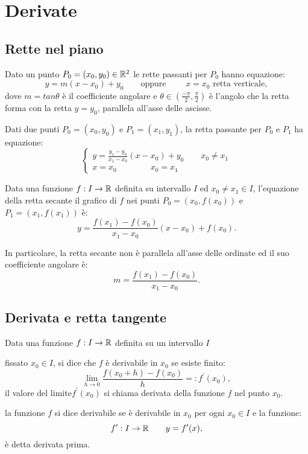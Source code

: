 
\chapter{Derivate} %

\label{ch:derivate} %


\section{Rette nel piano}
Dato un punto $P_0=(x_0,y_0)\in\mathbb{R}^2$ le rette passanti per $P_0$ hanno equazione:
\[y=m(x-x_0)+y_0 \qquad \text{oppure } \qquad x=x_0 \text{ retta verticale},\]
dove $m=tan\theta$ è il coefficiente angolare e $\theta\in(\frac{-\pi}{2},\frac{\pi}{2})$ è l'angolo che la retta forma con la retta $y=y_0$, parallela all'asse delle ascisse.

Dati due punti $P_0=(x_0,y_0)$ e $P_1=(x_1,y_1)$, la retta passante per $P_0$ e $P_1$ ha equazione:
\begin{equation*}\begin{cases}
y=\frac{y_1-y_0}{x_1-x_0}(x-x_0)+y_0 \qquad x_0\neq x_1 \\
x=x_0 \qquad \qquad x_0=x_1
\end{cases}\end{equation*}

Data una funzione $f:I\rightarrow\mathbb{R}$ definita su intervallo $I$ ed $x_0\neq x_1 \in I$, l'equazione della retta secante il grafico di $f$ nei punti $P_0=(x_0,f(x_0))$ e $P_1=(x_1,f(x_1))$ è:
\[y=\frac{f(x_1)-f(x_0)}{x_1-x_0}(x-x_0)+f(x_0).\]

In particolare, la retta secante non è parallela all'asse delle ordinate ed il suo coefficiente angolare è:
\[m=\frac{f(x_1)-f(x_0)}{x_1-x_0}.\]

\section{Derivata e retta tangente}
Data una funzione $f:I\rightarrow\mathbb{R}$ definita su un intervallo $I$
\begin{aenumerate}
	\item fissato $x_0\in I$, si dice che $f$ è derivabile in $x_0$ se esiste finito:
	\[\lim_{h\to0}{\frac{f(x_0+h)-f(x_0)}{h}}=:f^\prime(x_0),\]
	il valore del limite$f^\prime(x_0)$ si chiama derivata della funzione $f$ nel punto $x_0$.
	\item la funzione $f$ si dice derivabile se è derivabile in $x_0$ per ogni $x_0\in I$ e la funzione:
	\[f^\prime : I\rightarrow\mathbb{R} \qquad y=f^\prime(x),\]
	è detta derivata prima.
\end{aenumerate}

